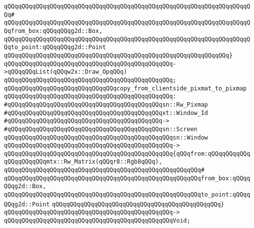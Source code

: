 \verb|qQQqqQQqqQQqqQQqqQQqqQQqqQQqqQQqqQQqqQQqqQQqqQQqqQQqqQQqqQQqqQQqqQQqqQQq#|\newline
\verb|qQQqqQQqqQQqqQQqqQQqqQQqqQQqqQQqqQQqqQQqqQQqqQQqqQQqqQQqqQQqqQQqqQQqqQQqfrom_box:qQQqqQQqg2d::Box,|\newline
\verb|qQQqqQQqqQQqqQQqqQQqqQQqqQQqqQQqqQQqqQQqqQQqqQQqqQQqqQQqqQQqqQQqqQQqqQQqto_point:qQQqqQQqg2d::Point|\newline
\verb|qQQqqQQqqQQqqQQqqQQqqQQqqQQqqQQqqQQqqQQqqQQqqQQqqQQqqQQqqQQqqQQq}|\newline
\verb|qQQqqQQqqQQqqQQqqQQqqQQqqQQqqQQqqQQqqQQqqQQqqQQq->qQQqqQQqList(qQQqw2x::Draw_OpqQQq)|\newline
\verb|qQQqqQQqqQQqqQQqqQQqqQQqqQQqqQQqqQQqqQQqqQQqqQQq;|\newline
\newline
\newline
\verb|qQQqqQQqqQQqqQQqqQQqqQQqqQQqqQQqcopy_from_clientside_pixmat_to_pixmap|\newline
\verb|qQQqqQQqqQQqqQQqqQQqqQQqqQQqqQQqqQQqqQQqqQQqqQQq:|\newline
\verb|#qQQqqQQqqQQqqQQqqQQqqQQqqQQqqQQqqQQqqQQqqQQqsn::Rw_Pixmap|\newline
\verb|#qQQqqQQqqQQqqQQqqQQqqQQqqQQqqQQqqQQqqQQqqQQqxt::Window_Id|\newline
\verb|#qQQqqQQqqQQqqQQqqQQqqQQqqQQqqQQqqQQqqQQqqQQq->|\newline
\verb|#qQQqqQQqqQQqqQQqqQQqqQQqqQQqqQQqqQQqqQQqqQQqsn::Screen|\newline
\verb|qQQqqQQqqQQqqQQqqQQqqQQqqQQqqQQqqQQqqQQqqQQqqQQqsn::Window|\newline
\verb|qQQqqQQqqQQqqQQqqQQqqQQqqQQqqQQqqQQqqQQqqQQqqQQq->|\newline
\verb|qQQqqQQqqQQqqQQqqQQqqQQqqQQqqQQqqQQqqQQqqQQqqQQq{qQQqfrom:qQQqqQQqqQQqqQQqqQQqqQQqmtx::Rw_Matrix(qQQqr8::Rgb8qQQq),|\newline
\verb|qQQqqQQqqQQqqQQqqQQqqQQqqQQqqQQqqQQqqQQqqQQqqQQqqQQqqQQq#|\newline
\verb|qQQqqQQqqQQqqQQqqQQqqQQqqQQqqQQqqQQqqQQqqQQqqQQqqQQqqQQqfrom_box:qQQqqQQqg2d::Box,|\newline
\verb|qQQqqQQqqQQqqQQqqQQqqQQqqQQqqQQqqQQqqQQqqQQqqQQqqQQqqQQqto_point:qQQqqQQqg2d::Point|\newline
\verb|qQQqqQQqqQQqqQQqqQQqqQQqqQQqqQQqqQQqqQQqqQQqqQQq}|\newline
\verb|qQQqqQQqqQQqqQQqqQQqqQQqqQQqqQQqqQQqqQQqqQQqqQQq->|\newline
\verb|qQQqqQQqqQQqqQQqqQQqqQQqqQQqqQQqqQQqqQQqqQQqqQQqVoid;|\newline
